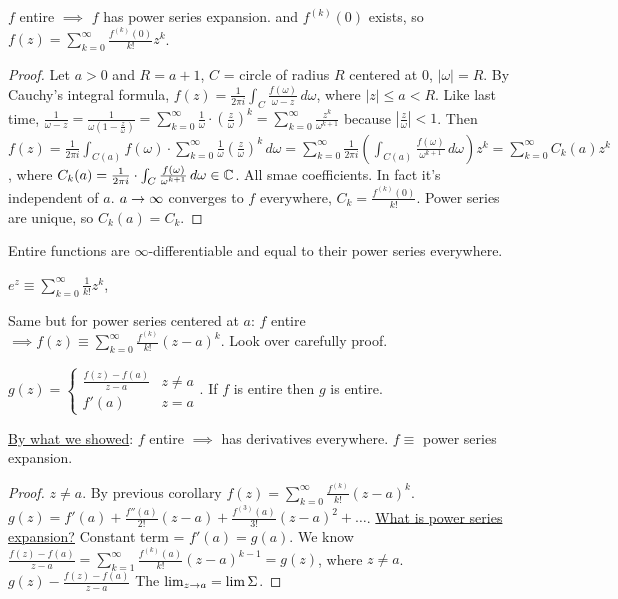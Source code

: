 \documentclass[]{article}
\begin{document}
\begin{theorem}
	 $f$ entire $\implies$ $f$ has power series expansion. and $f^{(k)}(0)$ exists, so $f(z) = \sum_{k=0}^\infty \frac{f^{(k)}(0)}{k!} z^k$.
\end{theorem}
\begin{proof}
	Let $a>0$ and $R=a+1$, $C$ = circle of radius $R$ centered at 0, $|\omega|=R$. By Cauchy's integral formula, $f(z) = \frac{1}{2\pi i} \int_C \frac{f(\omega)}{\omega-z} \, d\omega$, where $|z|\leq a<R$. Like last time, $\frac{1}{\omega-z} = \frac{1}{\omega(1-\frac{z}{\omega})} = \sum_{k=0}^\infty \frac{1}{\omega} \cdot \left( \frac{z}{\omega} \right)^k = \sum_{k=0}^\infty \frac{z^k}{\omega^{k+1}}$ because $|\frac{z}{\omega}|<1$. Then $f(z) = \frac{1}{2\pi i} \int_{C(a)} f(\omega) \cdot \sum_{k=0}^\infty \frac{1}{\omega} \left(\frac{z}{\omega}\right)^k \, d\omega = \sum_{k=0}^\infty \frac{1}{2\pi i} \left( \int_{C(a)} \frac{f(\omega)}{\omega^{k+1}} \, d\omega \right) z^k = \sum_{k=0}^\infty C_k(a) z^k$, where $C_k(a) = \frac{1}{2\pi i} \cdot \int_C \frac{f(\omega)}{\omega^{k+1}} \, d\omega \in\mathbb{C}$. All smae coefficients. In fact it's independent of $a$. $a\rightarrow\infty$ converges to $f$ everywhere, $C_k = \frac{f^{(k)}(0)}{k!}$. Power series are unique, so $C_k(a) = C_k$.
\end{proof}
\begin{corollary}
	Entire functions are $\infty$-differentiable and equal to their power series everywhere.
\end{corollary}
\begin{example}
	$e^z \equiv \sum_{k=0}^\infty \frac{1}{k!} z^k$, 
\end{example}
\begin{corollary}
	Same but for power series centered at $a$: $f$ entire $\implies f(z) \equiv \sum_{k=0}^\infty \frac{f^{(k)}}{k!}(z-a)^k$. Look over carefully proof.
\end{corollary}
\begin{proposition}
	$g(z) = \begin{cases} \frac{f(z)-f(a)}{z-a} & z\neq a \\ f'(a) & z=a \end{cases}$. If $f$ is entire then $g$ is entire.
\end{proposition}
\begin{note}
	\underline{By what we showed}: $f$ entire $\implies$ has derivatives everywhere. $f \equiv$ power series expansion.
\end{note}
\begin{proof}
	$z\neq a$. By previous corollary $f(z) = \sum_{k=0}^\infty \frac{f^{(k)}}{k!}(z-a)^k$. $g(z) = f'(a) + \frac{f''(a)}{2!}(z-a) + \frac{f^{(3)}(a)}{3!}(z-a)^2 + \dots$.
	\underline{What is power series expansion?} Constant term = $f'(a) = g(a)$. %
	We know $\frac{f(z)-f(a)}{z-a} = \sum_{k=1}^\infty \frac{f^{(k)}(a)}{k!} (z-a)^{k-1} = g(z)$, where $z\neq a$.
	$g(z) - \frac{f(z)-f(a)}{z-a}$ The $\lim_{z\rightarrow a} = \lim \Sigma$.
\end{proof}
\end{document}
